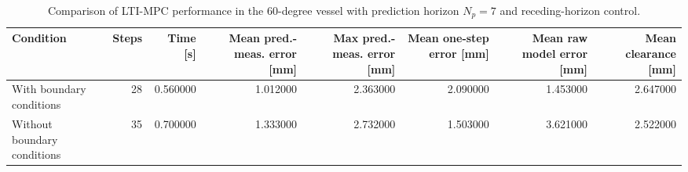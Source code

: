 \begin{table}
\caption{Comparison of LTI-MPC performance in the 60-degree vessel with prediction horizon $N_p=7$ and receding-horizon control.}
\label{tab:lti_mpc_boundary_comparison}
\begin{tabular}{lrrrrrrr}
\toprule
Condition & Steps & Time [s] & Mean pred.-meas. error [mm] & Max pred.-meas. error [mm] & Mean one-step error [mm] & Mean raw model error [mm] & Mean clearance [mm] \\
\midrule
With boundary conditions & 28 & 0.560000 & 1.012000 & 2.363000 & 2.090000 & 1.453000 & 2.647000 \\
Without boundary conditions & 35 & 0.700000 & 1.333000 & 2.732000 & 1.503000 & 3.621000 & 2.522000 \\
\bottomrule
\end{tabular}
\end{table}
